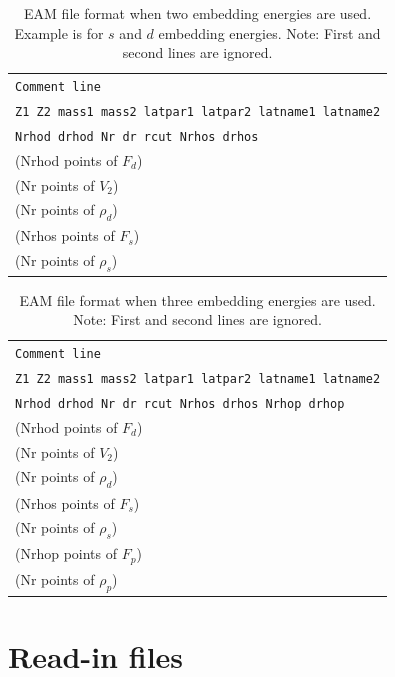 \documentclass[a4paper,12pt,pdftex,onecolumn]{article}
\begin{document}
\begin{table}[!h]
\caption{
EAM file format when two embedding energies are used.
Example is for $s$ and $d$ embedding energies.
Note: First and second lines are ignored.
\label{tab:kw-eam-ff2}
}
\begin{center}
\begin{tabular}{|l|}
\hline
\hline
\verb+Comment line+ \\
\verb+Z1 Z2 mass1 mass2 latpar1 latpar2 latname1 latname2+ \\
\verb+Nrhod drhod Nr dr rcut Nrhos drhos+ \\
(Nrhod points of $F_d$) \\
(Nr points of $V_2$)  \\
(Nr points of $\rho_d$) \\
(Nrhos points of $F_s$) \\
(Nr points of $\rho_s$) \\
\hline
\hline
\end{tabular}
\end{center}
\end{table}


\begin{table}[!h]
\caption{
EAM file format when three embedding energies are used.
Note: First and second lines are ignored.
\label{tab:kw-eam-ff3}
}
\begin{center}
\begin{tabular}{|l|}
\hline
\hline
\verb+Comment line+ \\
\verb+Z1 Z2 mass1 mass2 latpar1 latpar2 latname1 latname2+ \\
\verb+Nrhod drhod Nr dr rcut Nrhos drhos Nrhop drhop+ \\
(Nrhod points of $F_d$) \\
(Nr points of $V_2$) \\
(Nr points of $\rho_d$) \\
(Nrhos points of $F_s$) \\
(Nr points of $\rho_s$) \\
(Nrhop points of $F_p$) \\
(Nr points of $\rho_p$) \\
\hline
\hline
\end{tabular}
\end{center}
\end{table}








\section{Read-in files}
\end{document}
